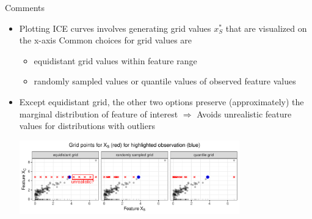 \documentclass[11pt,compress,t,notes=noshow, aspectratio=169, xcolor=table]{beamer}
\begin{document}
\begin{frame}{Comments}
\begin{itemize}
\item Plotting ICE curves involves generating grid values $x_S^*$ that are visualized on the x-axis
Common choices for grid values are
\begin{itemize}
\item equidistant grid values within feature range
\item randomly sampled values or quantile values of observed feature values
\end{itemize}
\item Except equidistant grid, the other two options preserve (approximately) the marginal distribution of feature of interest
$\Rightarrow$ Avoids unrealistic feature values for distributions with outliers

\vspace{3pt}
\centering
\includegraphics[width=0.75\textwidth, trim=0cm 0cm 0cm 0cm, clip]{figure/sampling}

\end{itemize}
\end{frame}

\endlecture
\end{document}
